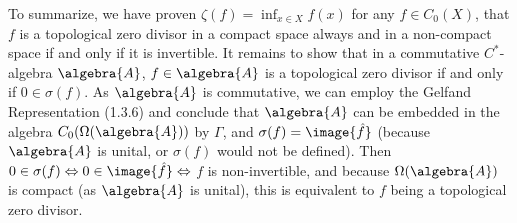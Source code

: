 \documentclass[a4paper]{article}
\begin{document}
To summarize, we have proven $\zeta(f) = \inf_{x \in X} f(x)$ for any $f \in C_0(X)$, that $f$ is a topological zero divisor in a compact space always and in a non-compact space if and only if it is invertible.
It remains to show that in a commutative $C^*$-algebra $\algebra{A}$, $f \in \algebra{A}$ is a topological zero divisor if and only if $0 \in \sigma(f)$.
As $\algebra{A}$ is commutative, we can employ the Gelfand Representation (1.3.6) and conclude that $\algebra{A}$ can be embedded in the algebra $C_0(\Omega(\algebra{A}))$ by $\Gamma$, and $\sigma(f) = \image{\hat{f}}$ (because $\algebra{A}$ is unital, or $\sigma(f)$ would not be defined). 
Then $0 \in \sigma(f) \iff 0 \in \image{\hat{f}} \iff $ $f$ is non-invertible, and because $\Omega(\algebra{A})$ is compact (as $\algebra{A}$ is unital), this is equivalent to $f$ being a topological zero divisor.
\end{document}
